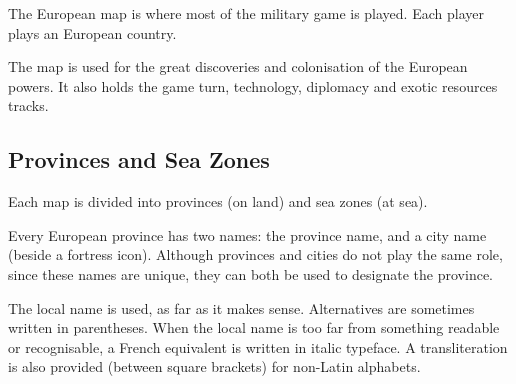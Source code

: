 \aparag[Europa] The European map is where most of the military game is
played. Each player plays an European country.

\aparag[\ROTW] The \ROTW map is used for the great discoveries and
colonisation of the European powers.
\bparag It also holds the game turn, technology, diplomacy and exotic
resources tracks.



\subsection{Provinces and Sea Zones}\label{chBasics:Provinces}

 Each map is divided into provinces (on land)
and sea zones (at sea).

\aparag[Names] Every European province has two names: the province name, and a
city name (beside a fortress icon).
\bparag Although provinces and cities do not play the same role, since these
names are unique, they can both be used to designate the province.
\begin{designnote}
  The local name is used, as far as it makes sense. Alternatives are sometimes
  written in parentheses. When the local name is too far from something
  readable or recognisable, a French equivalent is written in italic
  typeface. A transliteration is also provided (between square brackets) for
  non-Latin alphabets.
\end{designnote}

